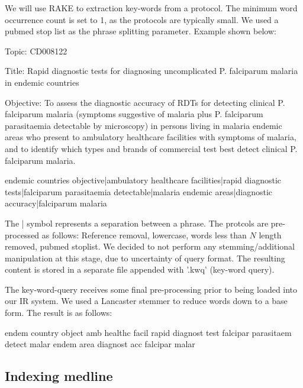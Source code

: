 We will use RAKE \cite{rake} to extraction key-words from a protocol. The minimum word occurrence count is set to 1, as the protocols are typically small. We used a pubmed stop list as the phrase splitting parameter. Example shown below:

\begin{tcolorbox}

Topic: CD008122 

Title: Rapid diagnostic tests for diagnosing uncomplicated P. falciparum malaria in endemic countries 

Objective: To assess the diagnostic accuracy of RDTs for detecting clinical P. falciparum malaria (symptoms suggestive of malaria plus P. falciparum parasitaemia detectable by microscopy) in persons living in malaria endemic areas who present to ambulatory healthcare facilities with symptoms of malaria, and to identify which types and brands of commercial test best detect clinical P. falciparum malaria.

\end{tcolorbox}

 
\begin{tcolorbox}

endemic countries objective|ambulatory healthcare facilities|rapid diagnostic tests|falciparum parasitaemia detectable|malaria endemic areas|diagnostic accuracy|falciparum malaria

\end{tcolorbox}

The | symbol represents a separation between a phrase. The protcols are pre-processed as follows: Reference removal, lowercase, words less than $N$ length removed, pubmed stoplist. We decided to not perform any stemming/additional manipulation at this stage, due to uncertainty of query format. The resulting content is stored in a separate file appended with '.kwq' (key-word query).

The key-word-query receives some final pre-processing prior to being loaded into our IR system. We used a Lancaster stemmer to reduce words down to a base form. The result is as follows:

\begin{tcolorbox}

endem country object amb healthc facil rapid diagnost test falcipar parasitaem detect malar endem area diagnost acc falcipar malar

\end{tcolorbox}

\subsection{Indexing medline}

